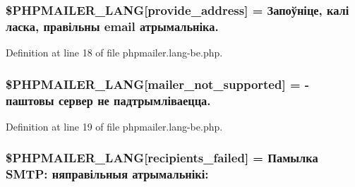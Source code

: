 \subsubsection[{\texorpdfstring{\$\+P\+H\+P\+M\+A\+I\+L\+E\+R\+\_\+\+L\+A\+NG}{$PHPMAILER_LANG}}]{\setlength{\rightskip}{0pt plus 5cm}\$P\+H\+P\+M\+A\+I\+L\+E\+R\+\_\+\+L\+A\+NG\mbox{[}\textquotesingle{}provide\+\_\+address\textquotesingle{}\mbox{]} = \textquotesingle{}Запоўніце, калі ласка, правільны {\bf email} атрымальніка.\textquotesingle{}}\hypertarget{phpmailer_8lang-be_8php_a8b97897c2406b7392b056f375feeefbb}{}\label{phpmailer_8lang-be_8php_a8b97897c2406b7392b056f375feeefbb}


Definition at line 18 of file phpmailer.\+lang-\/be.\+php.

\subsubsection[{\texorpdfstring{\$\+P\+H\+P\+M\+A\+I\+L\+E\+R\+\_\+\+L\+A\+NG}{$PHPMAILER_LANG}}]{\setlength{\rightskip}{0pt plus 5cm}\$P\+H\+P\+M\+A\+I\+L\+E\+R\+\_\+\+L\+A\+NG\mbox{[}\textquotesingle{}mailer\+\_\+not\+\_\+supported\textquotesingle{}\mbox{]} = \textquotesingle{} -\/ паштовы сервер не падтрымліваецца.\textquotesingle{}}\hypertarget{phpmailer_8lang-be_8php_aa2ebcb8833ee83a7ad67401c4bb3a6ad}{}\label{phpmailer_8lang-be_8php_aa2ebcb8833ee83a7ad67401c4bb3a6ad}


Definition at line 19 of file phpmailer.\+lang-\/be.\+php.

\subsubsection[{\texorpdfstring{\$\+P\+H\+P\+M\+A\+I\+L\+E\+R\+\_\+\+L\+A\+NG}{$PHPMAILER_LANG}}]{\setlength{\rightskip}{0pt plus 5cm}\$P\+H\+P\+M\+A\+I\+L\+E\+R\+\_\+\+L\+A\+NG\mbox{[}\textquotesingle{}recipients\+\_\+failed\textquotesingle{}\mbox{]} = \textquotesingle{}Памылка S\+M\+T\+P\+: няправільныя атрымальнікі\+: \textquotesingle{}}\hypertarget{phpmailer_8lang-be_8php_a7589d30bb9b368327c2df015f3e6bcba}{}\label{phpmailer_8lang-be_8php_a7589d30bb9b368327c2df015f3e6bcba}


